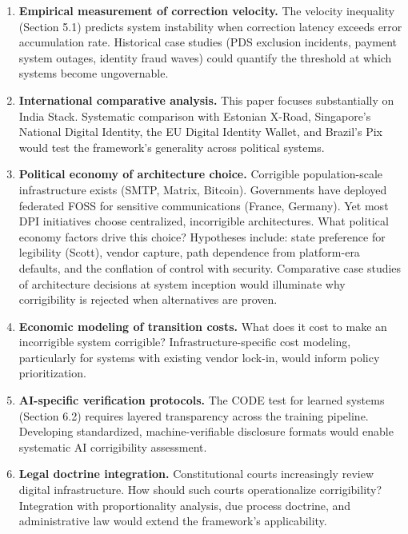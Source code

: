 \begin{enumerate}
    \item \textbf{Empirical measurement of correction velocity.} The velocity inequality (Section 5.1) predicts system instability when correction latency exceeds error accumulation rate. Historical case studies (PDS exclusion incidents, payment system outages, identity fraud waves) could quantify the threshold at which systems become ungovernable.

    \item \textbf{International comparative analysis.} This paper focuses substantially on India Stack. Systematic comparison with Estonian X-Road, Singapore's National Digital Identity, the EU Digital Identity Wallet, and Brazil's Pix would test the framework's generality across political systems.

    \item \textbf{Political economy of architecture choice.} Corrigible population-scale infrastructure exists (SMTP, Matrix, Bitcoin). Governments have deployed federated FOSS for sensitive communications (France, Germany). Yet most DPI initiatives choose centralized, incorrigible architectures. What political economy factors drive this choice? Hypotheses include: state preference for legibility (Scott), vendor capture, path dependence from platform-era defaults, and the conflation of control with security. Comparative case studies of architecture decisions at system inception would illuminate why corrigibility is rejected when alternatives are proven.

    \item \textbf{Economic modeling of transition costs.} What does it cost to make an incorrigible system corrigible? Infrastructure-specific cost modeling, particularly for systems with existing vendor lock-in, would inform policy prioritization.

    \item \textbf{AI-specific verification protocols.} The CODE test for learned systems (Section 6.2) requires layered transparency across the training pipeline. Developing standardized, machine-verifiable disclosure formats would enable systematic AI corrigibility assessment.

    \item \textbf{Legal doctrine integration.} Constitutional courts increasingly review digital infrastructure. How should such courts operationalize corrigibility? Integration with proportionality analysis, due process doctrine, and administrative law would extend the framework's applicability.


\end{enumerate}
